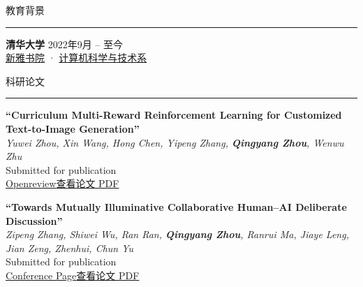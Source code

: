 \documentclass{resume} %
\renewenvironment{rSection}[1]{
\sectionskip
\textcolor{TsinghuaPurple}{\MakeUppercase{#1}}
\sectionlineskip
\hrule
\begin{list}{}{
\setlength{\leftmargin}{0em}
}
\item[]
}{
\end{list}
}
\begin{document}
  


\begin{rSection}{教育背景}

\textbf{清华大学} \hfill 2022年9月 -- 至今\\
\href{https://www.xyc.tsinghua.edu.cn/index.htm}{新雅书院} · 
\href{https://www.cs.tsinghua.edu.cn/}{计算机科学与技术系}

\end{rSection}

\begin{rSection}{科研论文}
\item
\textbf{``Curriculum Multi-Reward Reinforcement Learning for Customized Text-to-Image Generation''}\\
\textit{Yuwei Zhou, Xin Wang, Hong Chen, Yipeng Zhang, \textbf{Qingyang Zhou}, Wenwu Zhu}\\
Submitted for publication\\
\href{https://openreview.net/pdf?id=kiGUqX6Gct}{Openreview}\quad \href{https://esperarr.github.io/CV/assets/papers/Curriculum_Multi_Reward.pdf}{查看论文 PDF}

\item
\textbf{``Towards Mutually Illuminative Collaborative Human--AI Deliberate Discussion''}\\
\textit{Zipeng Zhang, Shiwei Wu, Ran Ran, \textbf{Qingyang Zhou}, Ranrui Ma, Jiaye Leng, Jian Zeng, Zhenhui, Chun Yu}\\
Submitted for publication\\
\href{https://new.precisionconference.com/uist25a/coauthor/subs/1831}{Conference Page}\quad \href{https://esperarr.github.io/CV/assets/papers/Towards_Mutually_Illuminative_Collaborative_Human%E2%80%93AI_Deliberate_Discussion.pdf}{查看论文 PDF}
\end{rSection}

\end{document}
